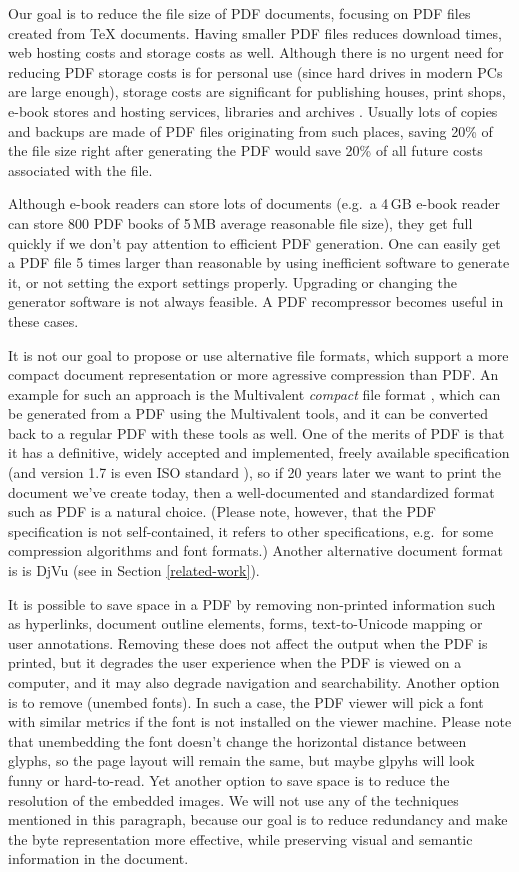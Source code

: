 \documentclass{ltugproc}
\begin{document}
Our goal is to reduce the file size of PDF documents, focusing on PDF files
created from \TeX{} documents. Having smaller PDF files reduces download
times, web hosting costs and storage costs as well. Although there is no
urgent need for reducing PDF storage costs is for personal use (since hard
drives in modern PCs are large enough), storage costs are significant for
publishing houses, print shops, e-book stores and hosting services,
libraries and archives \cite{multivalent-article}.
Usually lots of copies and backups are made of PDF
files originating from such places, saving 20\% of the file size right after
generating the PDF would save 20\% of all future costs associated with the
file.

Although e-book readers can store lots of documents (e.g.\ a 4\,GB e-book
reader can store 800 PDF books of 5\,MB average reasonable file size), they
get full quickly if we don't pay attention to efficient PDF generation. One
can easily get a PDF file 5 times larger than reasonable by using
inefficient software to generate it, or not setting the export settings
properly. Upgrading or changing the generator software is not always
feasible. A PDF recompressor becomes useful in these cases.

It is not our goal to propose or use
alternative file formats, which support a more
compact document representation or more agressive compression than PDF. An
example for such an approach is the Multivalent \emph{compact} file format
\cite{multivalent-compact}, which can be generated from a PDF using the
Multivalent tools, and it can be converted back to a regular PDF with these
tools as well. One of the merits of PDF is that it has a definitive, widely
accepted and implemented, freely available
specification \cite{pdfref} (and version 1.7 is
even ISO standard \cite{pdf-iso}), so if 20 years later we want to
print the document we've create today, then a well-documented and
standardized format such as PDF is a natural choice. (Please note, however,
that the PDF specification is not self-contained, it refers to other
specifications, e.g.\ for some compression algorithms and font formats.)
Another alternative document format is is DjVu (see in Section
\ref{related-work}).

It is possible to save space in a PDF by removing non-printed information
such as hyperlinks, document outline elements, forms, text-to-Unicode
mapping or user annotations. Removing these does not affect the output when
the PDF is printed, but it degrades the user experience when the PDF is
viewed on a computer, and it may also degrade navigation and searchability.
Another option is to remove (unembed fonts). In such a case, the PDF viewer
will pick a font with similar metrics if the font is not installed on the
viewer machine. Please note that unembedding the font doesn't change the
horizontal distance between glyphs, so the page layout will remain the
same, but maybe glpyhs will look funny or hard-to-read. Yet another option
to save space is to reduce the resolution of the embedded images. We will
not use any of the techniques mentioned in this paragraph, because our goal
is to reduce redundancy and make the byte representation more effective,
while preserving visual and semantic information in the document.
\end{document}
